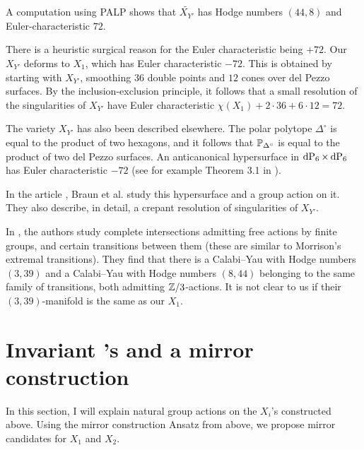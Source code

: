 A computation using PALP \cite{palp} shows that $\widetilde{X_{Y'}}$ has Hodge numbers $(44,8)$ and Euler-characteristic $72$. 

\begin{remark}
There is a heuristic surgical reason for the Euler characteristic being $+72$. Our $X_{Y'}$ deforms to $X_1$, which has Euler characteristic $-72$. This is obtained by starting with $X_{Y'}$, smoothing $36$ double points and $12$ cones over del Pezzo surfaces. By the inclusion-exclusion principle, it follows that a small resolution of the singularities of $X_{Y'}$ have Euler characteristic $\chi(X_1)+2\cdot 36 + 6 \cdot 12=72$.
\end{remark}

\begin{remark}
The variety $X_{Y'}$ has also been described elsewhere. The polar polytope $\Delta^{\circ}$ is equal to the product of two hexagons, and it follows that $\P_{\Delta^\circ}$ is equal to the product of two del Pezzo surfaces. An anticanonical hypersurface in $\dP6 \times \dP6$ has Euler characteristic $-72$ (see for example Theorem 3.1 in \cite{bestiary_hubsch}).

In the article \cite{braun_smallhodgenumbers}, Braun et al. study this hypersurface and a group action on it. They also describe, in detail, a crepant resolution of singularities of $X_{Y'}$.
\end{remark}

\begin{remark}
In \cite{candelas_newcy}, the authors study \CY complete intersections admitting free actions by finite groups, and certain transitions between them (these are similar to Morrison's extremal transitions). They find that there is a Calabi--Yau with Hodge numbers $(3,39)$ and a Calabi--Yau with Hodge numbers $(8,44)$ belonging to the same family of transitions, both admitting $\Z/3$-actions. It is not clear to us if their $(3,39)$-manifold is the same as our $X_1$.
\end{remark}

\section{Invariant \CY's and a mirror construction}

In this section, I will explain natural group actions on the $X_i$'s constructed above. Using the mirror construction Ansatz from above, we propose mirror candidates for $X_1$ and $X_2$.

